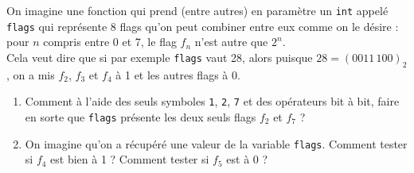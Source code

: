 \documentclass[a4paper,10pt,cours,firamath]{nsi}
\begin{document}
\begin{exercice}[]
	On imagine une fonction qui prend (entre autres) en paramètre un \texttt{int} appelé \texttt{flags} qui représente 8 flags qu'on peut combiner entre eux comme on le désire :
	pour $n$ compris entre 0 et 7, le flag $f_n$ n'est autre que $2^n$.\\
	Cela veut dire que si par exemple \texttt{flags} vaut 28, alors puisque $28=(0011\,100)_2$, on a mis $f_2$, $f_3$ et $f_4$ à 1 et les autres flags à 0.
	\begin{enumerate}
		\item 	Comment à l'aide des seuls symboles \texttt{1}, \texttt{2}, \texttt{7} et des opérateurs bit à bit, faire en sorte que \texttt{flags} présente les deux seuls flags $f_2$ et $f_7$ ?
		\item 	On imagine qu'on a récupéré une valeur de la variable \texttt{flags}. Comment tester si $f_4$ est bien à 1 ? Comment tester si $f_5$ est à 0 ?
	\end{enumerate}
\end{exercice}
\end{document}
